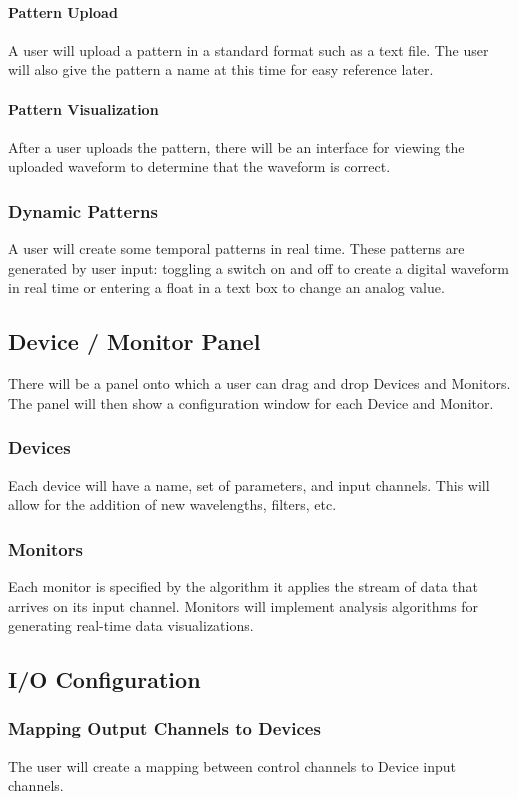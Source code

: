 \documentclass[a4paper,12pt]{article}
\begin{document}
\paragraph{Pattern Upload}
A user will upload a pattern in a standard format such as a text file.
The user will also give the pattern a name at this time for easy 
reference later.
\paragraph{Pattern Visualization}
After a user uploads the pattern, there will be an interface for viewing
the uploaded waveform to determine that the waveform is correct.
\subsubsection{Dynamic Patterns}
A user will create some temporal patterns in real time. These patterns
are generated by user input: toggling a switch on and off to create a 
digital waveform in real time or entering a float in a text box to change
an analog value.
\subsection{Device / Monitor Panel}
There will be a panel onto which a user can drag and drop Devices and Monitors. 
The panel will then show a configuration window for each Device and Monitor.
\subsubsection{Devices}
Each device will have a name, set of parameters, and input channels. This
will allow for the addition of new wavelengths, filters, etc.
\subsubsection{Monitors}
Each monitor is specified by the algorithm it applies the stream
of data that arrives on its input channel. Monitors will implement analysis
algorithms for generating real-time data visualizations.
\subsection{I/O Configuration}
\subsubsection{Mapping Output Channels to Devices}
The user will create a mapping between control channels to Device
input channels.
\end{document}
